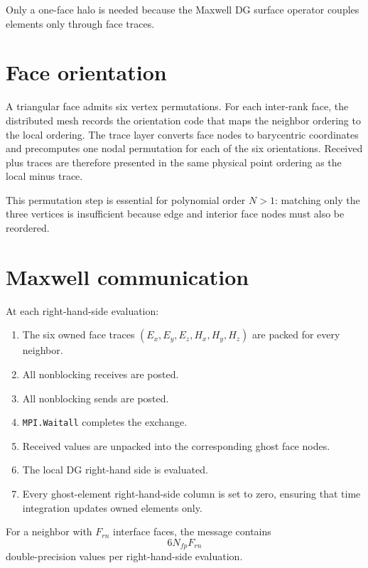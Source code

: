 \documentclass[11pt,oneside]{book}
\newcommand{\code}[1]{\texttt{#1}}
\begin{document}
Only a one-face halo is needed because the Maxwell DG surface operator couples
elements only through face traces.

\section{Face orientation}

A triangular face admits six vertex permutations. For each inter-rank face,
the distributed mesh records the orientation code that maps the neighbor
ordering to the local ordering. The trace layer converts face nodes to
barycentric coordinates and precomputes one nodal permutation for each of the
six orientations. Received plus traces are therefore presented in the same
physical point ordering as the local minus trace.

This permutation step is essential for polynomial order $N>1$: matching only
the three vertices is insufficient because edge and interior face nodes must
also be reordered.

\section{Maxwell communication}

At each right-hand-side evaluation:

\begin{enumerate}[leftmargin=*]
  \item The six owned face traces
        $(E_x,E_y,E_z,H_x,H_y,H_z)$ are packed for every neighbor.
  \item All nonblocking receives are posted.
  \item All nonblocking sends are posted.
  \item \code{MPI.Waitall} completes the exchange.
  \item Received values are unpacked into the corresponding ghost face nodes.
  \item The local DG right-hand side is evaluated.
  \item Every ghost-element right-hand-side column is set to zero, ensuring
        that time integration updates owned elements only.
\end{enumerate}

For a neighbor with $F_{rn}$ interface faces, the message contains
\begin{equation}
  6N_{fp}F_{rn}
\end{equation}
double-precision values per right-hand-side evaluation.
\end{document}
